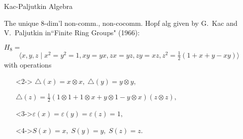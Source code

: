\documentclass{beamer}
\newcommand\1{_{(1)}}
\newcommand\2{_{(2)}}
\begin{document}
\begin{frame}{Kac-Paljutkin Algebra}


 The unique $8$-dim'l non-comm., non-cocomm. Hopf alg given by G.\ Kac and V.\ Paljutkin in``Finite Ring Groups" (1966):\newline

    $H_8=$
    \[\Big\langle x,y,z\;\vert\; x^2=y^2=1,xy=yx,zx=yz,zy=xz,z^2=\tfrac{1}{2}(1+x+y-xy)\Big\rangle\]
    with operations
    \vspace{2ex}
    \begin{itemize}
    \setlength{\itemsep}{2ex}
    \item[]<2->
    $\triangle(x)=x\otimes x,\; \triangle(y)=y\otimes y,\;$ 
    
    \vspace{2ex}
    
    $\triangle(z)=\tfrac{1}{2}(1\otimes 1+1\otimes x+y\otimes 1-y\otimes x)(z\otimes z),\;$
    
    \item[]<3->$
    \varepsilon(x)=\varepsilon(y)=\varepsilon(z)=1,$

    \item[]<4->$ S(x)=x,\;S(y)=y,\;S(z)=z.$ 
    \end{itemize}
\end{frame}
\end{document}
